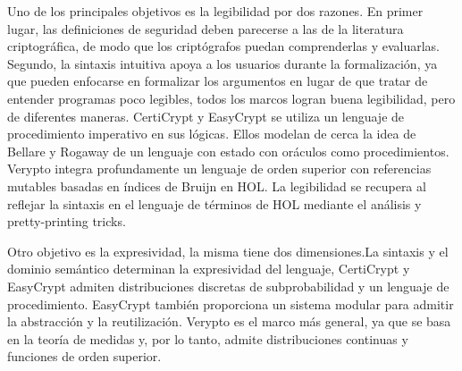 \documentclass[runningheads]{llncs}
\begin{document}
 Uno de los principales objetivos es la legibilidad por dos razones. En primer lugar, las definiciones de seguridad deben parecerse a las de la literatura criptográfica, de modo que los criptógrafos puedan comprenderlas y evaluarlas. Segundo, la sintaxis intuitiva apoya a los usuarios durante la formalización, ya que pueden enfocarse en formalizar los argumentos en lugar de que tratar de entender programas poco legibles, todos los marcos logran buena legibilidad, pero de diferentes maneras. CertiCrypt y EasyCrypt se utiliza un lenguaje de procedimiento imperativo en sus lógicas. Ellos modelan de cerca la idea de Bellare y Rogaway de un lenguaje con estado con oráculos como procedimientos\cite{ref_article3}. Verypto integra profundamente un lenguaje de orden superior con referencias mutables basadas en índices de Bruijn en HOL\cite{ref_article4}. La legibilidad se recupera al reflejar la sintaxis en el lenguaje de términos de HOL mediante el análisis y pretty-printing tricks.

 Otro objetivo es la expresividad, la misma tiene dos dimensiones.La sintaxis y el dominio semántico determinan la expresividad del lenguaje, CertiCrypt y EasyCrypt admiten distribuciones discretas de subprobabilidad y un lenguaje de procedimiento. EasyCrypt también proporciona un sistema modular para admitir la abstracción y la reutilización. Verypto es el marco más general, ya que se basa en la teoría de medidas y, por lo tanto, admite distribuciones continuas y funciones de orden superior.
 
\end{document}
